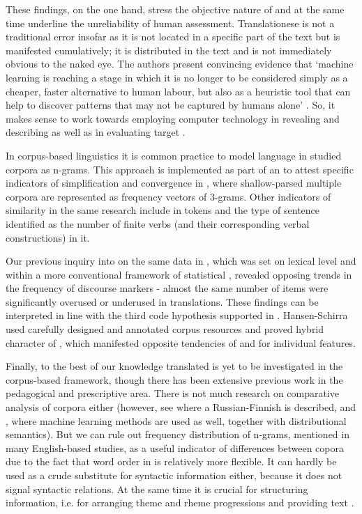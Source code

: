 \documentclass[output=paper]{langsci/langscibook.cls}
\begin{document}
These findings, on the one hand, stress the objective nature of  and at the same time underline the unreliability of human assessment. Translationese is not a traditional error insofar as it is not located in a specific part of the text but is manifested cumulatively; it is distributed in the text and is not immediately obvious to the naked eye. The authors present convincing evidence that `machine learning is reaching a stage in which it is no longer to be considered simply as a cheaper, faster alternative to human labour, but also as a heuristic tool that can help to discover patterns that may not be captured by humans alone' \citep[38]{baroni2005new}. So, it makes sense to work towards employing computer technology in revealing and describing  as well as in evaluating target .  

In corpus-based linguistics it is common practice to model language in studied corpora as  n-grams. This approach is implemented as part of an  to attest specific indicators of simplification and convergence in \citep{pastor2008translation}, where shallow-parsed multiple corpora are represented as frequency vectors of  3-grams. Other indicators of similarity in the same research include  in tokens and the type of sentence identified as the number of finite verbs (and their corresponding verbal constructions) in it.

Our previous inquiry into  on the same data in \citep{Kunilovskaya:2015}, which was set on lexical level and within a more conventional framework of statistical , revealed opposing trends in the frequency of discourse markers - almost the same number of items were significantly overused or underused in translations. These findings can be interpreted in line with the third code hypothesis supported in \citep{hansen2011between}. Hansen-Schirra used carefully designed and annotated corpus resources and proved hybrid character of , which manifested opposite tendencies of  and  for individual  features. 

Finally, to the best of our knowledge translated  is yet to be investigated in the corpus-based framework, though there has been extensive previous work in the pedagogical and prescriptive area. There is not much research on comparative analysis of  corpora either (however, see \citealt{mikhailov2003parallel} where a Russian-Finnish  is described, and \citealt{kutuzov2015comparing}, where machine learning methods are used as well, together with distributional semantics). But we can rule out frequency distribution of  n-grams, mentioned in many English-based studies, as a useful indicator of differences between copora due to the fact that word order in  is relatively more flexible. It can hardly be used as a crude substitute for syntactic information either, because it does not signal syntactic relations. At the same time it is crucial for structuring information, i.e. for arranging theme and rheme progressions and providing text  \citep{alekseyenko2013corpus}. 
\end{document}

